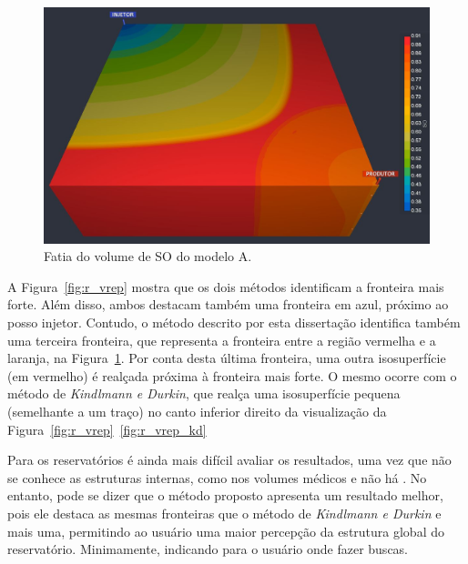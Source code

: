 \begin{figure}[h]
	\centering
	\includegraphics[width=1\textwidth]{images/r_vrep_so_slice}
	\caption{Fatia do volume de SO do modelo A.}
	\label{fig:box_slice}
\end{figure}

	A Figura~\ref{fig:r_vrep} mostra que os dois métodos identificam a fronteira mais forte. Além disso, ambos destacam também uma fronteira em azul, próximo ao posso injetor. Contudo, o método descrito por esta dissertação identifica também uma terceira fronteira, que representa a fronteira entre a região vermelha e a laranja, na Figura~\ref{fig:box_slice}. Por conta desta última fronteira, uma outra isosuperfície (em vermelho) é realçada próxima à fronteira mais forte. O mesmo ocorre com o método de \textit{Kindlmann e Durkin}, que realça uma isosuperfície pequena (semelhante a um traço) no canto inferior direito da visualização da Figura~\ref{fig:r_vrep}~\ref{fig:r_vrep_kd}
	
	Para os reservatórios é ainda mais difícil avaliar os resultados, uma vez que não se conhece as estruturas internas, como nos volumes médicos e não há . No entanto, pode se dizer que o método proposto apresenta um resultado melhor, pois ele destaca as mesmas fronteiras que o método de \textit{Kindlmann e Durkin} e mais uma, permitindo ao usuário uma maior percepção da estrutura global do reservatório. Minimamente, indicando para o usuário onde fazer buscas.

